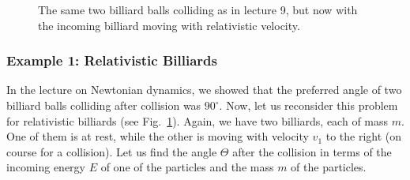 \documentclass[12pt]{article}
\begin{document}
\begin{figure}
\begin{center}

\end{center}
\caption{The same two billiard balls colliding as in lecture 9, but now with the incoming billiard moving with relativistic velocity. }\label{fig:billiards}
\end{figure}
\subsubsection*{Example 1: Relativistic Billiards}

In the lecture on Newtonian dynamics, we showed that the preferred angle of two billiard balls colliding after collision was $90^\circ$. Now, let us reconsider this problem for relativistic billiards (see Fig.~\ref{fig:billiards}). Again, we have two billiards, each of mass $m$. One of them is at rest, while the other is moving with velocity $v_1$ to the right (on course for a collision). Let us find the angle $\Theta$ after the collision in terms of the incoming energy $E$ of one of the particles and the mass $m$ of the particles. 
\end{document}
